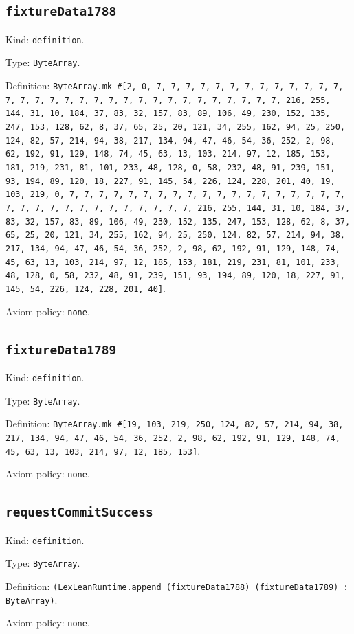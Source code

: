 \documentclass[11pt]{article}
\begin{document}
\subsection*{\texttt{fixtureData1788}}
\noindent Kind: \texttt{definition}.\par
\noindent Type: \texttt{ByteArray}.\par
\noindent Definition: \texttt{ByteArray.mk \#[2, 0, 7, 7, 7, 7, 7, 7, 7, 7, 7, 7, 7, 7, 7, 7, 7, 7, 7, 7, 7, 7, 7, 7, 7, 7, 7, 7, 7, 7, 7, 7, 7, 7, 216, 255, 144, 31, 10, 184, 37, 83, 32, 157, 83, 89, 106, 49, 230, 152, 135, 247, 153, 128, 62, 8, 37, 65, 25, 20, 121, 34, 255, 162, 94, 25, 250, 124, 82, 57, 214, 94, 38, 217, 134, 94, 47, 46, 54, 36, 252, 2, 98, 62, 192, 91, 129, 148, 74, 45, 63, 13, 103, 214, 97, 12, 185, 153, 181, 219, 231, 81, 101, 233, 48, 128, 0, 58, 232, 48, 91, 239, 151, 93, 194, 89, 120, 18, 227, 91, 145, 54, 226, 124, 228, 201, 40, 19, 103, 219, 0, 7, 7, 7, 7, 7, 7, 7, 7, 7, 7, 7, 7, 7, 7, 7, 7, 7, 7, 7, 7, 7, 7, 7, 7, 7, 7, 7, 7, 7, 7, 7, 7, 216, 255, 144, 31, 10, 184, 37, 83, 32, 157, 83, 89, 106, 49, 230, 152, 135, 247, 153, 128, 62, 8, 37, 65, 25, 20, 121, 34, 255, 162, 94, 25, 250, 124, 82, 57, 214, 94, 38, 217, 134, 94, 47, 46, 54, 36, 252, 2, 98, 62, 192, 91, 129, 148, 74, 45, 63, 13, 103, 214, 97, 12, 185, 153, 181, 219, 231, 81, 101, 233, 48, 128, 0, 58, 232, 48, 91, 239, 151, 93, 194, 89, 120, 18, 227, 91, 145, 54, 226, 124, 228, 201, 40]}.\par
\noindent Axiom policy: \texttt{none}.\par
\subsection*{\texttt{fixtureData1789}}
\noindent Kind: \texttt{definition}.\par
\noindent Type: \texttt{ByteArray}.\par
\noindent Definition: \texttt{ByteArray.mk \#[19, 103, 219, 250, 124, 82, 57, 214, 94, 38, 217, 134, 94, 47, 46, 54, 36, 252, 2, 98, 62, 192, 91, 129, 148, 74, 45, 63, 13, 103, 214, 97, 12, 185, 153]}.\par
\noindent Axiom policy: \texttt{none}.\par
\subsection*{\texttt{requestCommitSuccess}}
\noindent Kind: \texttt{definition}.\par
\noindent Type: \texttt{ByteArray}.\par
\noindent Definition: \texttt{(LexLeanRuntime.append (fixtureData1788) (fixtureData1789) : ByteArray)}.\par
\noindent Axiom policy: \texttt{none}.\par
\end{document}
